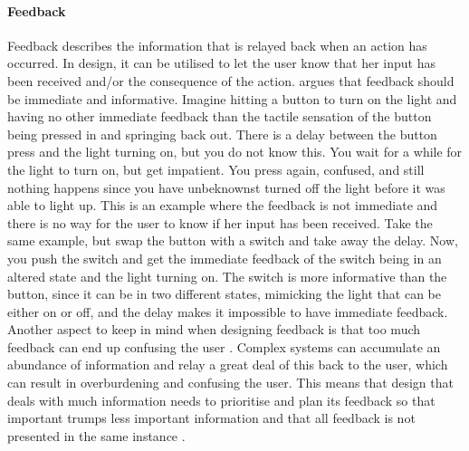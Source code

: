 \paragraph{Feedback} Feedback describes the information that is relayed back when an action has occurred. In design, it can be utilised to let the user know that her input has been received and/or the consequence of the action.  argues that feedback should be immediate and informative. Imagine hitting a button to turn on the light and having no other immediate feedback than the tactile sensation of the button being pressed in and springing back out. There is a delay between the button press and the light turning on, but you do not know this. You wait for a while for the light to turn on, but get impatient. You press again, confused, and still nothing happens since you have unbeknownst turned off the light before it was able to light up. This is an example where the feedback is not immediate and there is no way for the user to know if her input has been received. Take the same example, but swap the button with a switch and take away the delay. Now, you push the switch and get the immediate feedback of the switch being in an altered state and the light turning on. The switch is more informative than the button, since it can be in two different states, mimicking the light that can be either on or off, and the delay makes it impossible to have immediate feedback. Another aspect to keep in mind when designing feedback is that too much feedback can end up confusing the user \cite{norman}. Complex systems can accumulate an abundance of information and relay a great deal of this back to the user, which can result in overburdening and confusing the user. This means that design that deals with much information needs to prioritise and plan its feedback so that important trumps less important information and that all feedback is not presented in the same instance \cite{norman}.
